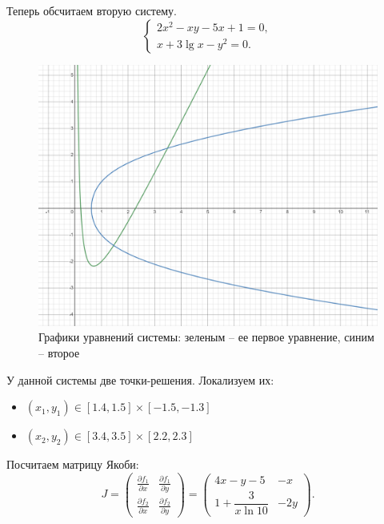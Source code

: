 		
		\newpage
		Теперь обсчитаем вторую систему.
		\begin{equation*}
			\begin{cases}
				2x^2 - xy - 5x + 1 = 0,\\
				x + 3\lg x - y^2 = 0.
			\end{cases}
		\end{equation*}
	
		\begin{figure}[h!]
			\centering
			\includegraphics[width=\linewidth]{Pictures/System2}
			\caption{Графики уравнений системы: зеленым -- ее первое уравнение, синим -- второе}
			\label{System2}
		\end{figure}
		У данной системы две точки-решения. Локализуем их:
		\begin{itemize}
			\item $(x_1, y_1) \in [1.4, 1.5] \times [-1.5, -1.3]$
			\item $(x_2, y_2) \in [3.4, 3.5] \times [2.2, 2.3]$
		\end{itemize}
	
		Посчитаем матрицу Якоби:
		\begin{equation*}
			J = \begin{pmatrix}
				\displaystyle\frac{\partial f_1}{\partial x} & \displaystyle\frac{\partial f_1}{\partial y}\\
				\displaystyle\frac{\partial f_2}{\partial x} & \displaystyle\frac{\partial f_2}{\partial y}
			\end{pmatrix} = 
			\begin{pmatrix}
				4x - y - 5 & -x \\
				1 + \dfrac{3}{x \ln 10} & -2y
			\end{pmatrix}.
		\end{equation*}
	
